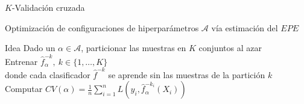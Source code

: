 \documentclass[xcolor=x11names]{beamer}
\begin{document}

\begin{frame}{$K$-Validación cruzada}

Optimización de configuraciones de hiperparámetros $\mathcal{A}$ vía estimación del $EPE$

	\begin{block}{Idea}
		Dado un $\alpha \in \mathcal{A}$, particionar las muestras en $K$ conjuntos al azar
		\\
		Entrenar $\hat{f}_{\alpha}^{-k}, \ k \in \{1, \ldots, K\}$
		\\
		donde cada clasificador $\hat{f}^{-k}$ se aprende sin las muestras de la partición $k$
		\\
		Computar $CV(\alpha) = \frac{1}{n} \sum^n_{i=1} L\left( y_i, \hat{f}_{\alpha}^{-k_i}(X_i) \right)$
	\end{block}


\end{frame}
\end{document}

